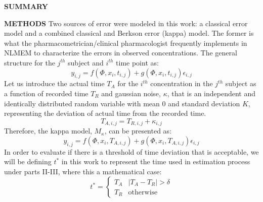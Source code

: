 \documentclass[final]{beamer}
\newlength{\colwidth}
\begin{document}
\begin{frame}[t]
\begin{columns}[t]
\begin{column}{\colwidth}
\begin{alertblock}{\textbf{SUMMARY}}
  \end{alertblock}
  \begin{block}{\textbf{METHODS}}
Two sources of error were modeled in this work: a classical error model and a combined classical and Berkson error (kappa) model. The former is what the pharmacometrician/clinical pharmacologist frequently implements in NLMEM to characterize the errors in observed concentrations. The general structure for the $j^{th}$ subject and $i^{th}$ time point as:
\begin{equation}\label{eq:1}
y_{i,j} = f(\Phi, x_i, t_{i,j}) + g(\Phi, x_i, t_{i,j})\epsilon_{i,j}
\end{equation}
Let us introduce the actual time $T_A$ for the $i^{th}$ concentration in the $j^{th}$ subject as a function of recorded time   $T_R$ and gaussian noise, $\kappa$, that is an independent and identically distributed random variable with mean 0 and standard deviation $K$, representing the deviation of actual time from the recorded time.
\begin{equation}\label{eq:two}
	T_{A,i,j} = T_{R,i,j} + \kappa_{i,j}
\end{equation}
Therefore, the kappa model, $M_\kappa$, can be presented as:
\begin{equation}\label{eq:three}
y_{i,j} = f(\Phi, x_i, T_{A,i,j}) + g(\Phi, x_i, T_{A,i,j})\epsilon_{i,j}
\end{equation}
In order to evaluate if there is a threshold of time deviation that is acceptable, we will be defining $t^*$ in this work to represent the time used in estimation process under parts II-III, where this a mathematical case:
\begin{equation}\label{eq:for}
t^* = \begin{cases} T_A & |T_A - T_R| > \delta \\ T_R & \mathrm{otherwise} \end{cases}
\end{equation}


\end{block}
\end{column}
\end{columns}
\end{frame}
\end{document}
